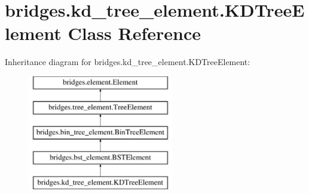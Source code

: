 \hypertarget{classbridges_1_1kd__tree__element_1_1_k_d_tree_element}{}\section{bridges.\+kd\+\_\+tree\+\_\+element.\+K\+D\+Tree\+Element Class Reference}
\label{classbridges_1_1kd__tree__element_1_1_k_d_tree_element}
Inheritance diagram for bridges.\+kd\+\_\+tree\+\_\+element.\+K\+D\+Tree\+Element\+:\begin{figure}[H]
\begin{center}
\leavevmode
\includegraphics[height=5.000000cm]{classbridges_1_1kd__tree__element_1_1_k_d_tree_element}
\end{center}
\end{figure}
